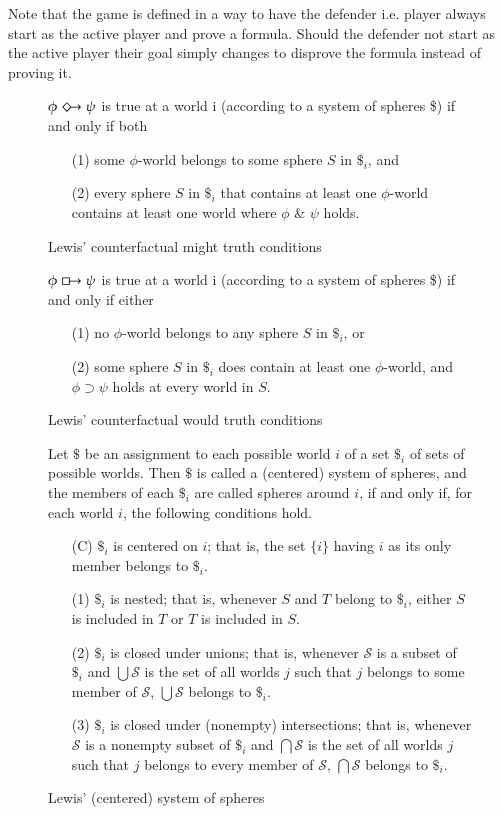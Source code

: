 \documentclass[a4paper,american]{paper}
\theoremstyle{definition}\newtheorem{definition}{Definition}
\begin{document}
	Note that the game is defined in a way to have the defender i.e. player always start as the active player and prove a formula. Should the defender not start as the active player their goal simply changes to disprove the formula instead of proving it.
	\newpage
\begin{figure}[H]
	\centering
	$\phi\Diamondright\psi$ is true at a world i (according to a system of spheres \$) if and only if both
	\begin{itemize}
	\item[(1)] some $\phi$-world belongs to some sphere $S$ in $\$_i$, and
	\item[(2)] every sphere $S$ in $\$_i$ that contains at least one $\phi$-world contains at least one world where $\phi$ \& $\psi$ holds.
	\end{itemize}
	\caption{Lewis' counterfactual might truth conditions}
	\label{fig:counterfactual_might}
\end{figure}
\begin{figure}[H]
	\centering
	$\phi\boxright\psi$ is true at a world i (according to a system of spheres \$) if and only if either
	\begin{itemize}
	\item[(1)] no $\phi$-world belongs to any sphere $S$ in $\$_i$, or
	\item[(2)] some sphere $S$ in $\$_i$ does contain at least one $\phi$-world, and $\phi\supset\psi$ holds at every world in $S$.
	\end{itemize}
	\caption{Lewis' counterfactual would truth conditions}
	\label{fig:counterfactual_would}
\end{figure}
\begin{figure}[H]
	\centering
	Let $\$$ be an assignment to each possible world $i$ of a set $\$_i$ of sets of possible worlds. Then $\$$ is called a (centered) system of spheres, and the members of each $\$_i$ are called spheres around $i$, if and only if, for each world $i$, the following conditions hold.
	\begin{itemize}
	\item[(C)] $\$_i$ is centered on $i$; that is, the set $\{i\}$ having $i$ as its only member belongs to $\$_i$.
	\item[(1)] $\$_i$ is nested; that is, whenever $S$ and $T$ belong to $\$_i$, either $S$ is included in $T$ or $T$ is included in $S$.
	\item[(2)] $\$_i$ is closed under unions; that is, whenever $\mathscr{S}$ is a subset of $\$_i$ and $\bigcup\mathscr{S}$ is the set of all worlds $j$ such that $j$ belongs to some member of $\mathscr{S}$, $\bigcup\mathscr{S}$ belongs to $\$_i$.
	\item[(3)] $\$_i$ is closed under (nonempty) intersections; that is, whenever $\mathscr{S}$ is a nonempty subset of $\$_i$ and $\bigcap\mathscr{S}$ is the set of all worlds $j$ such that $j$ belongs to every member of $\mathscr{S}$, $\bigcap\mathscr{S}$ belongs to $\$_i$.
	\end{itemize}
	\caption{Lewis' (centered) system of spheres}
	\label{fig:system_of_spheres}
\end{figure}
\end{document}
